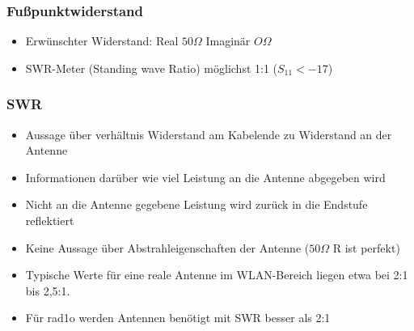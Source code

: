 %


\begin{frame}
    \frametitle{Fußpunktwiderstand}
    \begin{center}
	\begin{itemize}
		\item Erwünschter Widerstand: Real $50 \Omega$ Imaginär $O \Omega$
		\item SWR-Meter (Standing wave Ratio) möglichst 1:1 ($S_{11} < -17$)
    \end{itemize}
 	\end{center}
\end{frame}

\begin{frame}
    \frametitle{SWR}
    \begin{center}
	\begin{itemize}
		\item Aussage über verhältnis Widerstand am Kabelende zu Widerstand an der Antenne
		\item Informationen darüber wie viel Leistung an die Antenne abgegeben wird
		\item Nicht an die Antenne gegebene Leistung wird zurück in die Endstufe reflektiert
		\item Keine Aussage über Abstrahleigenschaften der Antenne ($50 \Omega$ R ist perfekt)
		\item Typische Werte für eine reale Antenne im WLAN-Bereich liegen etwa bei 2:1 bis 2,5:1.
		\item Für rad1o werden Antennen benötigt mit SWR besser als 2:1
    \end{itemize}
 	\end{center}
\end{frame}

